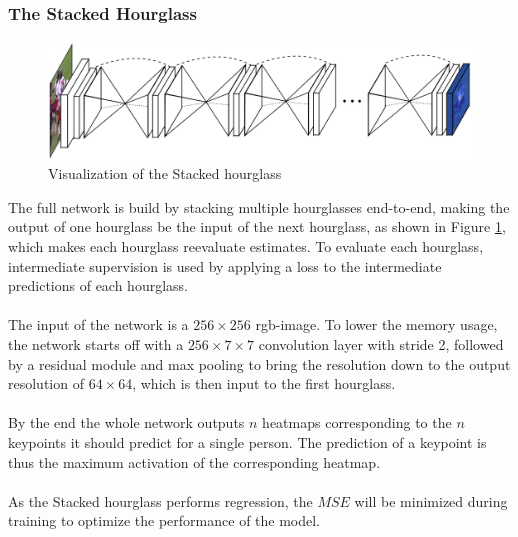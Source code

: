 \documentclass[./main.tex]{subfiles}
\begin{document}
\subsubsection{The Stacked Hourglass}
\begin{figure}[htbp]
    \centering
    \includegraphics[height = 4 cm]{entities/SHG.png}
    \caption{Visualization of the Stacked hourglass \cite{Newell}}
    \label{fig:SHG}
\end{figure}
\noindent The full network is build by stacking multiple hourglasses end-to-end, making the output of one hourglass be the input of the next hourglass, as shown in Figure \ref{fig:SHG}, which makes each hourglass reevaluate estimates. To evaluate each hourglass, intermediate supervision is used by applying a loss to the intermediate predictions of each hourglass.
\\
\\
The input of the network is a $256 \times 256$ rgb-image. To lower the memory usage, the network starts off with a $256 \times 7 \times 7$ convolution layer with stride 2, followed by a residual module and max pooling to bring the resolution down to the output resolution of $64 \times 64$, which is then input to the first hourglass.
\\
\\
By the end the whole network outputs $n$ heatmaps corresponding to the $n$ keypoints it should predict for a single person. The prediction of a keypoint is thus the maximum activation of the corresponding heatmap.
\\
\\
As the Stacked hourglass performs regression, the $MSE$ will be minimized during training to optimize the performance of the model.
\end{document}
